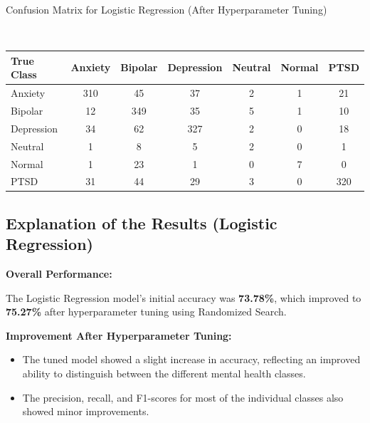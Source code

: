 \begin{center}
\caption{Confusion Matrix for Logistic Regression (After Hyperparameter Tuning)} \\
\begin{tabular}{|l|c|c|c|c|c|c|}
\hline
\textbf{True Class} & \textbf{Anxiety} & \textbf{Bipolar} & \textbf{Depression} & \textbf{Neutral} & \textbf{Normal} & \textbf{PTSD} \\ \hline
Anxiety             & 310              & 45               & 37                  & 2                & 1               & 21            \\ \hline
Bipolar             & 12               & 349              & 35                  & 5                & 1               & 10            \\ \hline
Depression          & 34               & 62               & 327                 & 2                & 0               & 18            \\ \hline
Neutral             & 1                & 8                & 5                   & 2                & 0               & 1             \\ \hline
Normal              & 1                & 23               & 1                   & 0                & 7               & 0             \\ \hline
PTSD                & 31               & 44               & 29                  & 3                & 0               & 320           \\ \hline
\end{tabular}
\end{center}

\subsection{Explanation of the Results (Logistic Regression)}

\textbf{Overall Performance:}

The Logistic Regression model's initial accuracy was \textbf{73.78\%}, which improved to \textbf{75.27\%} after hyperparameter tuning using Randomized Search.

\textbf{Improvement After Hyperparameter Tuning:}

\begin{itemize}
    \item The tuned model showed a slight increase in accuracy, reflecting an improved ability to distinguish between the different mental health classes.
    \item The precision, recall, and F1-scores for most of the individual classes also showed minor improvements.
\end{itemize}

